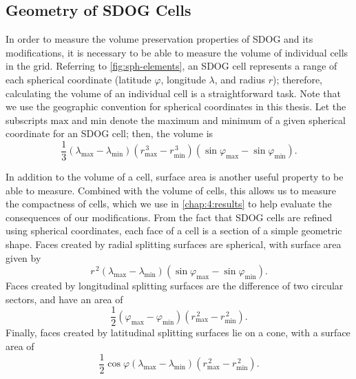 \subsection{Geometry of SDOG Cells} \label{chap:4:geom}
In order to measure the volume preservation properties of SDOG and its modifications, it is necessary to be able to measure the volume of individual cells in the grid.
Referring to \cref{fig:sph-elements}, an SDOG cell represents a range of each spherical coordinate (latitude $\varphi$, longitude $\lambda$, and radius $r$); therefore, calculating the volume of an individual cell is a straightforward task.
Note that we use the geographic convention for spherical coordinates in this thesis.
Let the subscripts $\mathrm{max}$ and $\mathrm{min}$ denote the maximum and minimum of a given spherical coordinate for an SDOG cell; then, the volume is \cite{yu2009sdog}
%
\begin{equation} \label{eq:volume}
\frac{1}{3} \left( \lambda_\mathrm{max} - \lambda_\mathrm{min} \right) \left(r_\mathrm{max}^{\,3} - r_\mathrm{min}^{\,3} \right) \left(\sin\varphi_\mathrm{max} - \sin\varphi_\mathrm{min} \right).
\end{equation}


In addition to the volume of a cell, surface area is another useful property to be able to measure.
Combined with the volume of cells, this allows us to measure the compactness of cells, which we use in \cref{chap:4:results} to help evaluate the consequences of our modifications.
From the fact that SDOG cells are refined using spherical coordinates, each face of a cell is a section of a simple geometric shape.
Faces created by radial splitting surfaces are spherical, with surface area given by
%
\begin{equation*}
r^{\,2} \left( \lambda_\mathrm{max} - \lambda_\mathrm{min} \right) \left( \sin\varphi_\mathrm{max} - \sin\varphi_\mathrm{min} \right).
\end{equation*}
%
Faces created by longitudinal splitting surfaces are the difference of two circular sectors, and have an area of
%
\begin{equation*}
\frac{1}{2} \left( \varphi_\mathrm{max} - \varphi_\mathrm{min} \right) \left( r_\mathrm{max}^{\,2} - r_\mathrm{min}^{\,2} \right).
\end{equation*}
%
Finally, faces created by latitudinal splitting surfaces lie on a cone, with a surface area of
%
\begin{equation*}
\frac{1}{2} \cos\varphi \left( \lambda_\mathrm{max} - \lambda_\mathrm{min} \right) \left( r_\mathrm{max}^{\,2} - r_\mathrm{min}^{\,2} \right).
\end{equation*}


